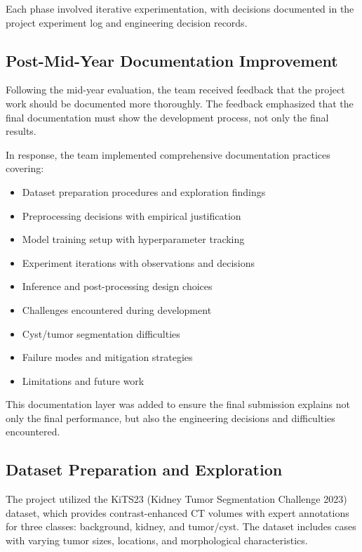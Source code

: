 Each phase involved iterative experimentation, with decisions documented in the project experiment log and engineering decision records.

\subsection{Post-Mid-Year Documentation Improvement}

Following the mid-year evaluation, the team received feedback that the project work should be documented more thoroughly. The feedback emphasized that the final documentation must show the development process, not only the final results.

In response, the team implemented comprehensive documentation practices covering:
\begin{itemize}
    \item Dataset preparation procedures and exploration findings
    \item Preprocessing decisions with empirical justification
    \item Model training setup with hyperparameter tracking
    \item Experiment iterations with observations and decisions
    \item Inference and post-processing design choices
    \item Challenges encountered during development
    \item Cyst/tumor segmentation difficulties
    \item Failure modes and mitigation strategies
    \item Limitations and future work
\end{itemize}

This documentation layer was added to ensure the final submission explains not only the final performance, but also the engineering decisions and difficulties encountered.

\subsection{Dataset Preparation and Exploration}

The project utilized the KiTS23 (Kidney Tumor Segmentation Challenge 2023) dataset, which provides contrast-enhanced CT volumes with expert annotations for three classes: background, kidney, and tumor/cyst. The dataset includes cases with varying tumor sizes, locations, and morphological characteristics.

